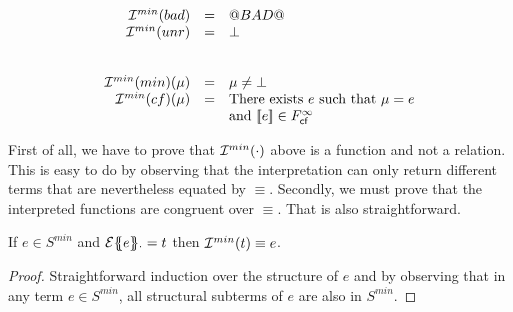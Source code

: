 \[\begin{array}{rcl}
  {\cal I}^{min}(bad)       & = & @BAD@ \\
  {\cal I}^{min}(unr)       & = & \bot \\ \\ \\ 
  {\cal I}^{min}(min)(\mu)  & = & \mu \neq \bot \\ 
  {\cal I}^{min}(cf)(\mu)   & = & \mbox{There exists } e \mbox{ such that } \mu = e \\ 
                       &   & \mbox{and } [\![e]\!] \in F_{\textsf{cf}}^{\infty} 
\end{array}\]

First of all, we have to prove that ${\cal I}^{min}(\cdot)$ above is a function and not a relation. 
This is easy to do by observing that the interpretation can only return 
different terms that are nevertheless equated by $\equiv$. Secondly, we must prove that the interpreted 
functions are congruent over $\equiv$. That is also straightforward.

\begin{lemma}\label{lem:min-interp}
If $e \in S^{min}$ and ${\cal E}\{\!\!\{e\}\!\!\}_{\cdot} = t$ then ${\cal I}^{min}(t) \equiv e$.
\end{lemma}
\begin{proof} Straightforward induction over the structure of $e$ and by observing 
that in any term $e \in S^{min}$, all structural subterms of $e$ are also in $S^{min}$.
\end{proof}

